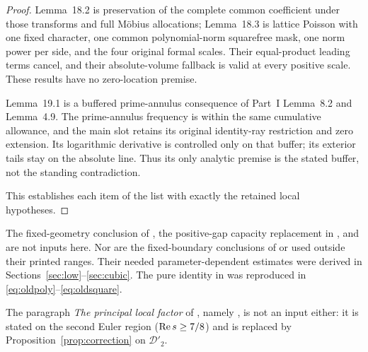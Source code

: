 \begin{proof}
Lemma~18.2 is preservation of the complete common coefficient under those transforms and full Möbius allocations; Lemma~18.3 is lattice Poisson with one fixed character, one common polynomial-norm squarefree mask, one norm power per side, and the four original formal scales. Their equal-product leading terms cancel, and their absolute-volume fallback is valid at every positive scale. These results have no zero-location premise.

Lemma~19.1 is a buffered prime-annulus consequence of Part~I Lemma~8.2 and Lemma~4.9. The prime-annulus frequency is within the same cumulative allowance, and the main slot retains its original identity-ray restriction and zero extension. Its logarithmic derivative is controlled only on that buffer; its exterior tails stay on the absolute line. Thus its only analytic premise is the stated buffer, not the standing contradiction.

This establishes each item of the list with exactly the retained local hypotheses.
\end{proof}

The fixed-geometry conclusion of , the positive-gap capacity replacement in , and  are not inputs here. Nor are the fixed-boundary conclusions of  or  used outside their printed ranges. Their needed parameter-dependent estimates were derived in Sections~\ref{sec:low}--\ref{sec:cubic}. The pure identity in  was reproduced in \eqref{eq:oldpoly}--\eqref{eq:oldsquare}.

The paragraph \emph{The principal local factor} of , namely , is not an input either: it is stated on the second Euler region  ($\operatorname{Re} s\ge7/8$) and is replaced by Proposition~\ref{prop:correction} on $\mathcal D'_2$.
